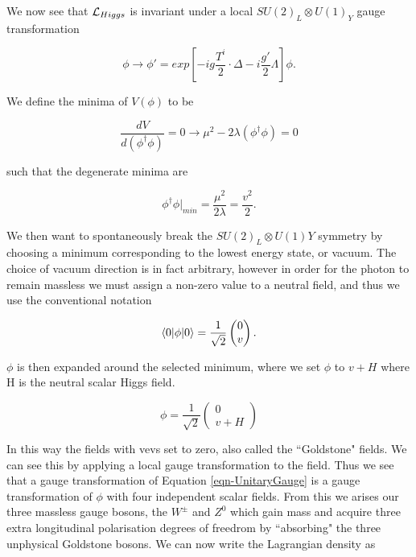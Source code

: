 We now see that $\mathcal{L}_{Higgs}$ is invariant under a local $SU(2)_L \otimes U(1)_Y$ gauge transformation 

\begin{equation}
\phi \to \phi' = exp[-ig\frac{T^i}{2}\cdot \Delta - i\frac{g'}{2}\Lambda]\phi.
\end{equation}

We define the minima of $V(\phi)$ to be 

\begin{equation}
\frac{dV}{d(\phi^\dagger\phi)} = 0 \rightarrow \mu^2 - 2\lambda(\phi^{\dagger}\phi) = 0
\end{equation}

such that the degenerate minima are

\begin{equation}
\phi^{\dagger}\phi|_{min} = \frac{\mu^2}{2\lambda} = \frac{v^2}{2}.
\end{equation}

We then want to spontaneously break the $SU(2)_L \otimes U(1)Y$ symmetry by choosing a minimum corresponding to the lowest energy state, or 
vacuum. The choice of vacuum direction is in fact arbitrary, however in order for the photon to remain massless we must assign a non-zero value 
to a neutral field, and thus we use the conventional notation

\begin{equation} \label{eqn-HiggsDoublet}
\braket{0|\phi|0} = \frac{1}{\sqrt{2}}
\begin{pmatrix}
0 \\
v
\end{pmatrix}.
\end{equation}

$\phi$ is then expanded around the selected minimum, where we set $\phi$ to $v + H$ where H is the neutral scalar Higgs field.

\begin{equation} \label{eqn-UnitaryGauge}
\phi = \frac{1}{\sqrt{2}}
\begin{pmatrix}
0 \\
v + H
\end{pmatrix}
\end{equation}

In this way the fields with vevs set to zero, also called the ``Goldstone" fields. We can see this by applying a local gauge transformation to 
the field. Thus we see that a gauge transformation of Equation \ref{eqn-UnitaryGauge} is a gauge transformation of $\phi$ with four independent 
scalar fields. From this we arises our three massless gauge bosons, the $W^{\pm}$ and $Z^0$ which gain mass and acquire three extra 
longitudinal polarisation degrees of freedrom by ``absorbing" the three unphysical Goldstone bosons. We can now write the Lagrangian density as 

